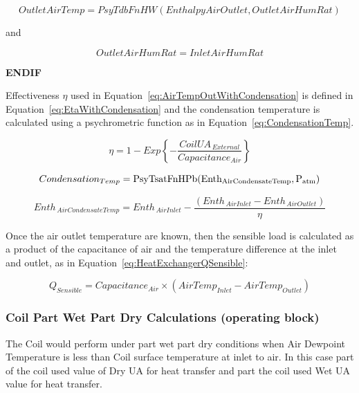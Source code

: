 \begin{equation}
OutletAirTemp = PsyTdbFnHW(EnthalpyAirOutlet, OutletAirHumRat)
\end{equation}

and

\begin{equation}
OutletAirHumRat = InletAirHumRat
\end{equation}

\textbf{ENDIF}

Effectiveness \(\eta\) used in Equation~\ref{eq:AirTempOutWithCondensation} is defined in Equation~\ref{eq:EtaWithCondensation} and the condensation temperature is calculated using a psychrometric function as in Equation~\ref{eq:CondensationTemp}.

\begin{equation}
\eta  = 1 - Exp\left\{ { - \frac{{CoilU{A_{\,External}}}}{{Capacitanc{e_{Air}}}}} \right\}
\label{eq:EtaWithCondensation}
\end{equation}

\begin{equation}
Condensatio{n_{Temp}} = {\rm{PsyTsatFnHPb(Ent}}{{\rm{h}}_{{\rm{AirCondensateTemp}}}}{\rm{,P_{atm}) }}
\label{eq:CondensationTemp}
\end{equation}

\begin{equation}
Ent{h_{\,AirCondensateTemp}} = Ent{h_{\,AirInlet}} - \frac{{\left( {Ent{h_{\,AirInlet}} - Ent{h_{\,AirOutlet}}} \right)}}{\eta }
\end{equation}

Once the air outlet temperature are known, then the sensible load is calculated as a product of the capacitance of air and the temperature difference at the inlet and outlet, as in Equation~\ref{eq:HeatExchangerQSensible}:

\begin{equation}
{Q_{Sensible}} = Capacitanc{e_{Air}} \times \left( {AirTem{p_{Inlet}} - AirTem{p_{Outlet}}} \right)
\label{eq:HeatExchangerQSensible}
\end{equation}

\subsubsection{Coil Part Wet Part Dry Calculations (operating block)}\label{coil-part-wet-part-dry-calculations-operating-block}

The Coil would perform under part wet part dry conditions when Air Dewpoint Temperature is less than Coil surface temperature at inlet to air. In this case part of the coil used value of Dry UA for heat transfer and part the coil used Wet UA value for heat transfer.

